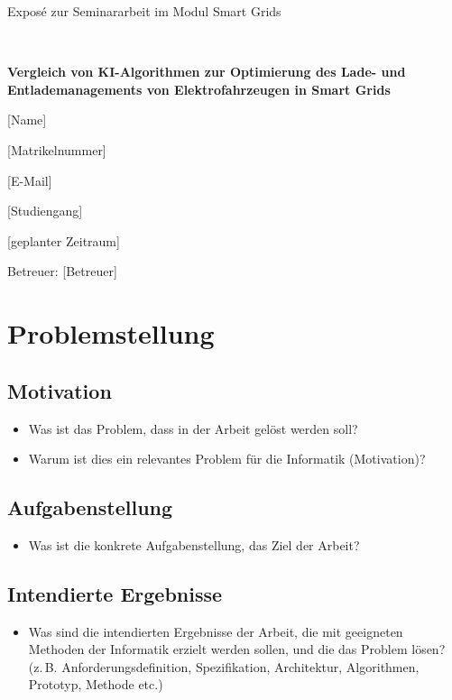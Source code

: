 \documentclass[12pt]{article} %
\begin{document}
\begin{center}
   \baselineskip
   
   Exposé zur Seminararbeit im Modul Smart Grids
   
   ~
   
   {\LARGE\bfseries
      Vergleich von KI-Algorithmen zur Optimierung des Lade- und Entlademanagements von Elektrofahrzeugen in Smart Grids}

   \large
   [Name]
   
   [Matrikelnummer]
   
   [E-Mail]
   
   [Studiengang]
   
   [geplanter Zeitraum]
   
   Betreuer: [Betreuer]
\end{center}

\section{Problemstellung}

\subsection{Motivation}
\begin{itemize}
\item Was ist das Problem, dass in der Arbeit gelöst werden soll?
\item Warum ist dies ein relevantes Problem für die Informatik (Motivation)?
\end{itemize}

\subsection{Aufgabenstellung}
\begin{itemize}
\item Was ist die konkrete Aufgabenstellung, das Ziel der Arbeit?
\end{itemize}

\subsection{Intendierte Ergebnisse}
\begin{itemize}
\item Was sind die intendierten Ergebnisse der Arbeit, die mit geeigneten Methoden
der Informatik erzielt werden sollen, und die das Problem lösen?
(z.\,B. Anforderungsdefinition, Spezifikation, Architektur, Algorithmen, Prototyp, Methode etc.)
\end{itemize}
\end{document}
